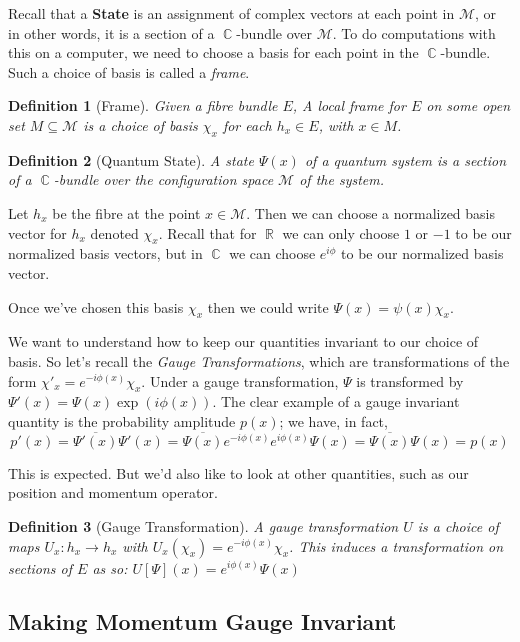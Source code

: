 \documentclass{article}
\DeclareMathOperator{\RR}{\mathbb{R}}
\DeclareMathOperator{\CC}{\mathbb{C}}
\newtheorem{defn}{Definition}
\begin{document}
Recall that a \textbf{State} is an assignment of complex vectors at each point in $\mathcal{M}$, or in other words, it is a section of a $\CC$-bundle over $\mathcal{M}$. To do computations with this on a computer, we need to choose a basis for each point in the $\CC$-bundle. Such a choice of basis is called a \textit{frame}.

\begin{defn}[Frame]
	Given a fibre bundle $E$, A \textit{local frame} for $E$ on some open set $M \subseteq \mathcal{M}$ is a choice of basis $\chi_x$ for each $h_x \in E$, with $x \in M$.
\end{defn}

\begin{defn}[Quantum State]
	A state $\Psi(x)$ of a quantum system is a \textit{section} of a $\CC$-bundle over the configuration space $\mathcal{M}$ of the system.
\end{defn}

Let $h_x$ be the fibre at the point $x \in \mathcal{M}$. Then we can choose a normalized basis vector for $h_x$ denoted $\chi_x$. Recall that for $\RR$ we can only choose $1$ or $-1$ to be our normalized basis vectors, but in $\CC$ we can choose $e^{i\phi}$ to be our normalized basis vector.

Once we've chosen this basis $\chi_x$ then we could write $\Psi(x) = \psi(x) \chi_x$.

We want to understand how to keep our quantities invariant to our choice of basis. So let's recall the \textit{Gauge Transformations}, which are transformations of the form $\chi'_x = e^{-i\phi(x)}\chi_x$. Under a gauge transformation, $\Psi$ is transformed by $\Psi'(x) = \Psi(x) \exp(i\phi(x))$. The clear example of a gauge invariant quantity is the probability amplitude $p(x)$; we have, in fact, 
\[p'(x)= \overline{\Psi'(x)}\Psi'(x)= \overline{\Psi(x)} e^{-i\phi(x)}e^{i\phi(x)}\Psi(x)=\overline{\Psi(x)}\Psi(x)=p(x)  \]

 This is expected. But we'd also like to look at other quantities, such as our position and momentum operator.

\begin{defn}[Gauge Transformation]
	A gauge transformation $U$ is a choice of maps $U_x : h_x \to h_x$ with $U_x(\chi_x) = e^{-i\phi(x)}\chi_x$. This induces a transformation on sections of $E$ as so: $U[\Psi](x) = e^{i\phi(x)}\Psi(x) $
\end{defn}

\subsection{Making Momentum Gauge Invariant}
\end{document}
